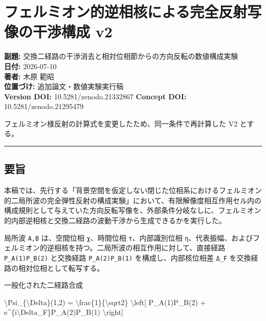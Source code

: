 \documentclass[
  a4paper,
]{article}
\author{}
\date{}
\newenvironment{Shaded}{}{}
\newcommand{\NormalTok}[1]{#1}
\begin{document}
\section{フェルミオン的逆相核による完全反射写像の干渉構成
v2}\label{ux30d5ux30a7ux30ebux30dfux30aaux30f3ux7684ux9006ux76f8ux6838ux306bux3088ux308bux5b8cux5168ux53cdux5c04ux5199ux50cfux306eux5e72ux6e09ux69cbux6210-v2}

\textbf{副題:}
交換二経路の干渉消去と相対位相節からの方向反転の数値構成実験\\
\textbf{日付:} 2026-07-10\\
\textbf{著者:} 木原 範昭\\
\textbf{位置づけ:} 追加論文・数値実験実行稿\\
\textbf{Version DOI:} 10.5281/zenodo.21332867 \textbf{Concept DOI:}
10.5281/zenodo.21295479

フェルミオン様反射の計算式を変更したため、同一条件で再計算した V2
とする。

\begin{center}\rule{0.5\linewidth}{0.5pt}\end{center}

\subsection{要旨}\label{ux8981ux65e8}

本稿では、先行する「背景空間を仮定しない閉じた位相系におけるフェルミオン的二局所波の完全弾性反射の構成実験」において、有限解像度相互作用セル内の構成規則として与えていた方向反転写像を、外部条件分岐なしに、フェルミオン的内部逆相核と交換二経路の波動干渉から生成できるかを実行した。

局所波 \texttt{A,B} は、空間位相 \texttt{χ}、時間位相
\texttt{τ}、内部識別位相
\texttt{η}、代表振幅、およびフェルミオン的逆相核を持つ。二局所波の相互作用に対して、直接経路
\texttt{P\_A(1)P\_B(2)} と交換経路 \texttt{P\_A(2)P\_B(1)}
を構成し、内部核位相差 \texttt{Δ\_F}
を交換経路の相対位相として転写する。

一般化された二経路合成

\begin{Shaded}
\begin{Highlighting}[]
\NormalTok{\textbackslash{}Psi\_\{\textbackslash{}Delta\}(1,2)}
\NormalTok{=}
\NormalTok{\textbackslash{}frac\{1\}\{\textbackslash{}sqrt2\}}
\NormalTok{\textbackslash{}left[}
\NormalTok{P\_A(1)P\_B(2)}
\NormalTok{+}
\NormalTok{e\^{}\{i\textbackslash{}Delta\_F\}P\_A(2)P\_B(1)}
\NormalTok{\textbackslash{}right]}
\end{Highlighting}
\end{Shaded}
\end{document}
